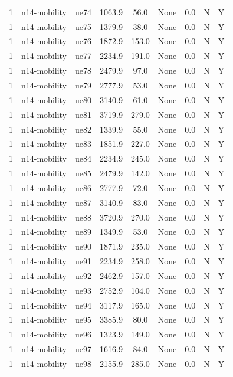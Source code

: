\begin{table}[ht]
\begin{tabular}{|c|c|c|c|c|c|c|c|c|}
1 & n14-mobility & ue74 & 1063.9 & 56.0 & None & 0.0 & N & Y \\
1 & n14-mobility & ue75 & 1379.9 & 38.0 & None & 0.0 & N & Y \\
1 & n14-mobility & ue76 & 1872.9 & 153.0 & None & 0.0 & N & Y \\
1 & n14-mobility & ue77 & 2234.9 & 191.0 & None & 0.0 & N & Y \\
1 & n14-mobility & ue78 & 2479.9 & 97.0 & None & 0.0 & N & Y \\
1 & n14-mobility & ue79 & 2777.9 & 53.0 & None & 0.0 & N & Y \\
1 & n14-mobility & ue80 & 3140.9 & 61.0 & None & 0.0 & N & Y \\
1 & n14-mobility & ue81 & 3719.9 & 279.0 & None & 0.0 & N & Y \\
1 & n14-mobility & ue82 & 1339.9 & 55.0 & None & 0.0 & N & Y \\
1 & n14-mobility & ue83 & 1851.9 & 227.0 & None & 0.0 & N & Y \\
1 & n14-mobility & ue84 & 2234.9 & 245.0 & None & 0.0 & N & Y \\
1 & n14-mobility & ue85 & 2479.9 & 142.0 & None & 0.0 & N & Y \\
1 & n14-mobility & ue86 & 2777.9 & 72.0 & None & 0.0 & N & Y \\
1 & n14-mobility & ue87 & 3140.9 & 83.0 & None & 0.0 & N & Y \\
1 & n14-mobility & ue88 & 3720.9 & 270.0 & None & 0.0 & N & Y \\
1 & n14-mobility & ue89 & 1349.9 & 53.0 & None & 0.0 & N & Y \\
1 & n14-mobility & ue90 & 1871.9 & 235.0 & None & 0.0 & N & Y \\
1 & n14-mobility & ue91 & 2234.9 & 258.0 & None & 0.0 & N & Y \\
1 & n14-mobility & ue92 & 2462.9 & 157.0 & None & 0.0 & N & Y \\
1 & n14-mobility & ue93 & 2752.9 & 104.0 & None & 0.0 & N & Y \\
1 & n14-mobility & ue94 & 3117.9 & 165.0 & None & 0.0 & N & Y \\
1 & n14-mobility & ue95 & 3385.9 & 80.0 & None & 0.0 & N & Y \\
1 & n14-mobility & ue96 & 1323.9 & 149.0 & None & 0.0 & N & Y \\
1 & n14-mobility & ue97 & 1616.9 & 84.0 & None & 0.0 & N & Y \\
1 & n14-mobility & ue98 & 2155.9 & 285.0 & None & 0.0 & N & Y \\

\end{tabular}
\end{table}

